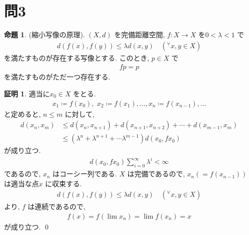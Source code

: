 \documentclass[10pt, fleqn, label-section=none]{bxjsarticle}
\theoremstyle{definition}
\newtheorem{prop}[dfn]{命題}
\newtheorem*{pf*}{証明}
\newcommand{\any}{{}^{\forall}}
\renewcommand{\;}{\, ; \,}
\begin{document}
\section{問3}


\begin{prop}(縮小写像の原理). $(X, d)$ を完備距離空間, $f: X \rightarrow X$ を$0 < \lambda < 1$ で
\begin{align*} d(f(x), f(y)) \leq \lambda d(x, y)  \quad (\any x, y \in X) \end{align*}
を満たすものが存在する写像とする. このとき, $p \in X $ で
\begin{align*} fp = p\end{align*}
を満たすものがただ一つ存在する. 
\end{prop}
\begin{pf*}適当に$x_0 \in X$ をとる. 
\begin{align*}  x_1 \coloneqq f(x_0), \,\, x_2 \coloneqq f(x_1), \ldots, x_n \coloneqq f(x_{n-1}), \ldots  \end{align*}
と定めると, $n \leq m$ に対して, 
\begin{align*} d(x_n, x_m) &\leq d(x_n, x_{n+1})+ d(x_{n + 1}, x_{n+2}) + \cdots + d(x_{m-1}, x_m) \\&\leq (\lambda ^n + \lambda^{n+1} + \cdots \lambda ^{m-1}) d(x_0, fx_0)  \end{align*}
が成り立つ. 
\begin{align*} d(x_0, fx_0) \sum_{i = 0}^{\infty } \lambda^i < \infty  \end{align*}
であるので, $x_n$ はコーシー列である. $X$ は完備であるので, $x_n (= f(x_{n-1}))$ は適当な点$x$ に収束する. 
\begin{align*} d(f(x), f(y)) \leq \lambda d(x, y)  \quad (\any x, y \in X) \end{align*}
より, $f$ は連続であるので, 
\begin{align*} f(x) = f(\lim x_n) = \lim f(x_n) = x \end{align*}
が成り立つ. 
\qed
\end{pf*}
\end{document}
